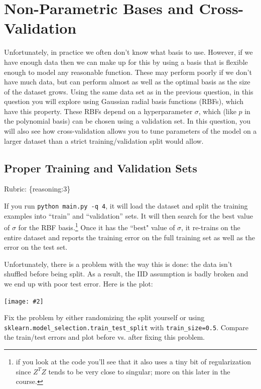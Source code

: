 \documentclass{article}
\def\rubric#1{\gre{Rubric: \{#1\}}}{}
\def\blu#1{{\color{blu}#1}}
\def\gre#1{{\color{gre}#1}}
\newcommand{\centerfig}[2]{\begin{center}\texttt{[image: \#2]}\end{center}}
\begin{document}
\section{Non-Parametric Bases and Cross-Validation}

Unfortunately, in practice we often don't know what basis to use.
However, if we have enough data then we can make up for this by using a basis that is flexible enough to
model any reasonable function. These may perform poorly if we don't have much data, but can
 perform almost as well as the optimal basis as the size of the dataset grows.
Using the same data set as in the previous question, 
in this question you will explore using Gaussian radial basis functions (RBFs),
 which have this property. These RBFs depend on a hyperparameter $\sigma$, which
 (like $p$ in the polynomial basis) can be chosen using a validation set.
 In this question, you will also see how cross-validation allows you to tune
 parameters of the model on a larger dataset than a strict training/validation split would allow.


\subsection{Proper Training and Validation Sets}
\rubric{reasoning:3}

If you run \verb|python main.py -q 4|, it will load the dataset and split the training examples
 into ``train'' and ``validation'' sets. It will then search for the best value of $\sigma$
 for the RBF basis.\footnote{if you look at the code you'll see that it also uses a tiny bit of regularization since $Z^TZ$ tends to be very close to singular; more on this later in the course.}
  Once it has the ``best" value of $\sigma$, it re-trains on the entire dataset and reports the
  training error on the full training set as well as the error on the test set.

Unfortunately, there is a problem with the way this is done: the data isn't shuffled before being split.
As a result, the IID assumption is badly broken and we end up with poor test error. Here is the plot:

\centerfig{.7}{../figs/least_squares_rbf_bad.pdf}


\blu{Fix the problem by either randomizing the split yourself or using \texttt{sklearn.model\_selection.train\_test\_split} with \texttt{train\_size=0.5}. Compare the train/test errors and plot before vs. after fixing this problem.}
\end{document}
